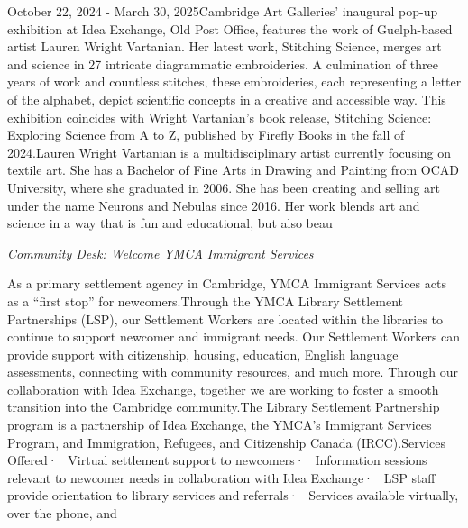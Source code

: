 \documentclass[letterpaper, 10pt]{article}
\newcommand{\subtitle}[1]{\textit{\large #1}\vspace{0.5em}}
\newcommand{\articlecontent}[1]{\small #1\vspace{1em}}
\begin{document}
\begin{multicols}{2}
{
\vspace{10px}

October 22, 2024 - March 30, 2025Cambridge Art Galleries' inaugural pop-up exhibition at Idea Exchange, Old Post Office, features the work of Guelph-based artist Lauren Wright Vartanian. Her latest work, Stitching Science, merges art and science in 27 intricate diagrammatic embroideries. A culmination of three years of work and countless stitches, these embroideries, each representing a letter of the alphabet, depict scientific concepts in a creative and accessible way. This exhibition coincides with Wright Vartanian’s book release, Stitching Science: Exploring Science from A to Z, published by Firefly Books in the fall of 2024.Lauren Wright Vartanian is a multidisciplinary artist currently focusing on textile art. She has a Bachelor of Fine Arts in Drawing and Painting from OCAD University, where she graduated in 2006. She has been creating and selling art under the name Neurons and Nebulas since 2016. Her work blends art and science in a way that is fun and educational, but also beau
}
\vspace{10px}

\subtitle{Community Desk: Welcome YMCA Immigrant Services}

\articlecontent{

\qrcode[height=1.5cm]{https://ideaexchange.libnet.info/event/11502103}
\vspace{10px}

As a primary settlement agency in Cambridge, YMCA Immigrant Services acts as a “first stop” for newcomers.Through the YMCA Library Settlement Partnerships (LSP), our Settlement Workers are located within the libraries to continue to support newcomer and immigrant needs. Our Settlement Workers can provide support with citizenship, housing, education, English language assessments, connecting with community resources, and much more. Through our collaboration with Idea Exchange, together we are working to foster a smooth transition into the Cambridge community.The Library Settlement Partnership program is a partnership of Idea Exchange, the YMCA’s Immigrant Services Program, and Immigration, Refugees, and Citizenship Canada (IRCC).Services Offered·  Virtual settlement support to newcomers·  Information sessions relevant to newcomer needs in collaboration with Idea Exchange·  LSP staff provide orientation to library services and referrals·  Services available virtually, over the phone, and 
}
\vspace{10px}


\end{multicols}
\end{document}
